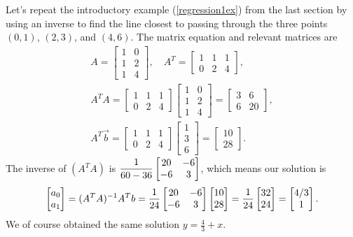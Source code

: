 \begin{example}
Let's repeat the introductory example (\ref{regression1ex}) from the last section by using an inverse to find the line closest to passing through the three points $(0,1)$, $(2,3)$, and $(4,6)$. The matrix equation and relevant matrices are
\begin{gather*}
A = \begin{bmatrix}1&0\\1&2\\1&4\end{bmatrix}, \quad
A^T = \begin{bmatrix}1&1&1\\0&2&4\end{bmatrix},\\
A^T A =\begin{bmatrix}1&1&1\\0&2&4\end{bmatrix}\begin{bmatrix}1&0\\1&2\\1&4\end{bmatrix}= \begin{bmatrix}3&6\\6&20\end{bmatrix},\\%
A^T\vec b =  \begin{bmatrix}1&1&1\\0&2&4\end{bmatrix}\begin{bmatrix}1\\3\\6\end{bmatrix} = \begin{bmatrix}10\\28\end{bmatrix}.
\end{gather*}
The inverse of $(A^TA)$ is $\displaystyle\frac{1}{60-36}\begin{bmatrix}20&-6\\-6&3\end{bmatrix}$, which means our solution is 
$$
\begin{bmatrix}a_0\\a_1\end{bmatrix} 
= (A^TA)^{-1}A^T b 
= \displaystyle\frac{1}{24}\begin{bmatrix}20&-6\\-6&3\end{bmatrix}\begin{bmatrix}10\\28\end{bmatrix}
= \displaystyle\frac{1}{24}\begin{bmatrix}32\\24\end{bmatrix}  
= \begin{bmatrix}4/3\\1\end{bmatrix}. 
$$
We of course obtained the same solution $y=\frac{4}{3}+x$.
\end{example}


